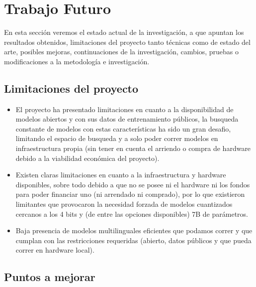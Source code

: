 \chapter{Trabajo Futuro}
\label{cha:trabajo_futuro}

En esta sección veremos el estado actual de la investigación, a que apuntan los resultados obtenidos, limitaciones del proyecto tanto técnicas como de estado del arte, posibles mejoras, continuaciones de la investigación, cambios, pruebas o modificaciones a la metodología e investigación.

\section{Limitaciones del proyecto}
\label{sec:limitaciones}
\begin{itemize}
    \item El proyecto ha presentado limitaciones en cuanto a la disponibilidad de modelos abiertos y con sus datos de entrenamiento públicos, la busqueda constante de modelos con estas características ha sido un gran desafio, limitando el espacio de busqueda y a solo poder correr modelos en infraestructura propia (sin tener en cuenta el arriendo o compra de hardware debido a la viabilidad económica del proyecto).

    \item Existen claras limitaciones en cuanto a la infraestructura y hardware disponibles, sobre todo debido a que no se posee ni el hardware ni los fondos para poder financiar uno (ni arrendado ni comprado), por lo que existieron limitantes que provocaron la necesidad forzada de modelos cuantizados cercanos a los 4 bits y (de entre las opciones disponibles) 7B de parámetros.
    
    \item Baja presencia de modelos multilinguales eficientes que podamos correr y que cumplan con las restricciones requeridas (abierto, datos públicos y que pueda correr en hardware local).
    
\end{itemize}

\section{Puntos a mejorar}

